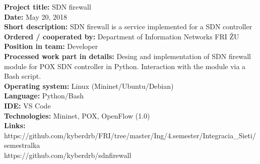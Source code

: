 \documentclass[slovak]{article}
\begin{document}
\noindent
\textbf{Project title:} SDN firewall\\
\textbf{Date:} May 20, 2018\\
\textbf{Short description:} SDN firewall is a service implemented for a SDN controller\\
\textbf{Ordered / cooperated by:} Department of Information Networks FRI ŽU\\
\textbf{Position in team:} Developer\\
\textbf{Processed work part in details:} Desing and implementation of SDN firewall module for POX SDN controller in Python. Interaction with the module via a Bash script.\\
\textbf{Operating system:} Linux (Mininet/Ubuntu/Debian)\\
\textbf{Language:} Python/Bash\\
\textbf{IDE:} VS Code\\
\textbf{Technologies:} Mininet, POX, OpenFlow (1.0)\\
\textbf{Links:}\\
https://github.com/kyberdrb/FRI/tree/master/Ing/4.semester/Integracia\_Sieti/semestralka\\
https://github.com/kyberdrb/sdnfirewall
\end{document}
